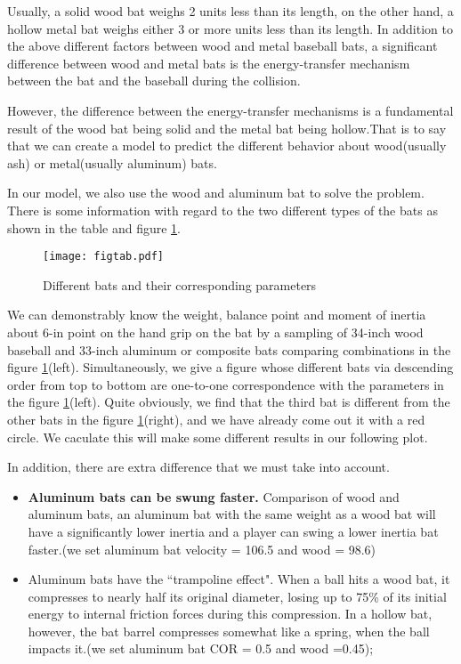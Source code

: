 Usually, a solid wood bat weighs 2 units less than its length, on the other hand, a hollow metal bat weighs either 3 or more units less than its length. In addition to the above different factors between wood and metal baseball bats, a significant difference between wood and metal bats is the energy-transfer mechanism between the bat and the baseball during the collision.

However, the difference between the energy-transfer mechanisms is a fundamental result of the wood bat being solid and the metal bat being hollow.That is to say that we can create a model to predict the different behavior about wood(usually ash) or metal(usually aluminum) bats.

In our model, we also use the wood and aluminum bat to solve the problem. There is some information with regard to the two different types of the bats as shown in the table and figure \ref{correspondingparameters}\cite{hollowsoftball}.

\begin{figure}[!htb]
\centering
\texttt{[image: figtab.pdf]}
\caption{\label{correspondingparameters}Different bats and their corresponding parameters\cite{Swing_Weights}}
\end{figure}


We can demonstrably know the weight, balance point and moment of inertia about 6-in point on the hand grip on the bat by a sampling of 34-inch wood baseball and 33-inch aluminum or composite bats comparing combinations in the figure \ref{correspondingparameters}(left). Simultaneously, we give a figure whose different bats via descending order from top to bottom are one-to-one correspondence with the parameters in the figure \ref{correspondingparameters}(left). Quite obviously, we find that the third bat is different from the other bats in the figure \ref{correspondingparameters}(right), and we have already come out it with a red circle. We caculate this will make some different results in our following plot. \cite{hollowsoftball}

In addition, there are extra difference that we must take into account.

\begin{itemize}
\item \textbf{Aluminum bats can be swung faster.} Comparison of wood and aluminum bats, an aluminum bat with the same weight as a wood bat will have a significantly lower inertia and a player can swing a lower inertia bat faster.(we set aluminum bat velocity = 106.5 and wood = 98.6)

\item Aluminum bats have the ``trampoline effect". When a ball hits a wood bat, it compresses to nearly half its original diameter, losing up to 75\% of its initial energy to internal friction forces during this compression. In a hollow bat, however, the bat barrel compresses somewhat like a spring, when the ball impacts it.(we set aluminum bat COR = 0.5 and wood =0.45);
\end{itemize}

